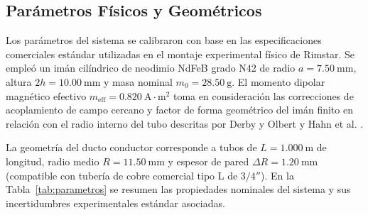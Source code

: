 \documentclass[aps,prb,reprint,twocolumn,superscriptaddress,amsmath,amssymb,floatfix]{revtex4-2}
\begin{document}
\subsection{Parámetros Físicos y Geométricos}
Los parámetros del sistema se calibraron con base en las especificaciones comerciales estándar utilizadas en el montaje experimental físico de Rimstar. Se empleó un imán cilíndrico de neodimio NdFeB grado N42 de radio $a = 7.50\ \mathrm{mm}$, altura $2h = 10.00\ \mathrm{mm}$ y masa nominal $m_0 = 28.50\ \mathrm{g}$. El momento dipolar magnético efectivo $m_{\mathrm{eff}} = 0.820\ \mathrm{A\cdot m^2}$ toma en consideración las correcciones de acoplamiento de campo cercano y factor de forma geométrico del imán finito en relación con el radio interno del tubo descritas por Derby y Olbert \cite{Derby2010} y Hahn et al. \cite{Hahn2002}. 

La geometría del ducto conductor corresponde a tubos de $L = 1.000\ \mathrm{m}$ de longitud, radio medio $R = 11.50\ \mathrm{mm}$ y espesor de pared $\Delta R = 1.20\ \mathrm{mm}$ (compatible con tubería de cobre comercial tipo L de $3/4''$). En la Tabla~\ref{tab:parametros} se resumen las propiedades nominales del sistema y sus incertidumbres experimentales estándar asociadas.
\end{document}
